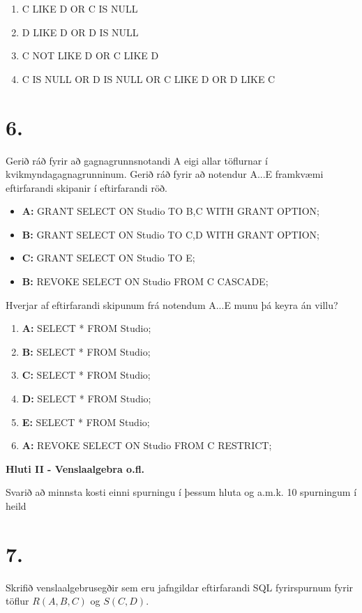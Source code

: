 \documentclass{article}
\newcommand{\bo}[1]{\textbf{#1}}
\newcommand{\enum}{\begin{enumerate}[label = \alph*.]}
\begin{document}
\enum
\item C LIKE D OR C IS NULL
\item D LIKE D OR D IS NULL
\item C NOT LIKE D OR C LIKE D
\item C IS NULL OR D IS NULL OR C LIKE D OR D LIKE C
\end{enumerate}

\newpage

\section{6.}
Gerið ráð fyrir að gagnagrunnsnotandi A eigi allar töflurnar í
kvikmyndagagnagrunninum. Gerið ráð fyrir að notendur A...E
framkvæmi eftirfarandi skipanir í eftirfarandi röð.

\begin{itemize}
\item \bo{A:} GRANT SELECT ON Studio TO B,C WITH GRANT OPTION;
\item \bo{B:} GRANT SELECT ON Studio TO C,D WITH GRANT OPTION;
\item \bo{C:} GRANT SELECT ON Studio TO E;
\item \bo{B:} REVOKE SELECT ON Studio FROM C CASCADE;
\end{itemize}
Hverjar af eftirfarandi skipunum frá notendum A...E munu þá keyra
án villu?
\enum
    \item \bo{A:} SELECT * FROM Studio;
    \item \bo{B:} SELECT * FROM Studio;
    \item \bo{C:} SELECT * FROM Studio;
    \item \bo{D:} SELECT * FROM Studio; 
    \item \bo{E:} SELECT * FROM Studio;
    \item \bo{A:} REVOKE SELECT ON Studio FROM C RESTRICT;
\end{enumerate}

\newpage

\begin{center}
    \bo{Hluti II - Venslaalgebra o.fl.}

    Svarið að minnsta kosti einni spurningu í þessum hluta og a.m.k.
    10 spurningum í heild
\end{center}

\section{7.}
Skrifið venslaalgebrusegðir sem eru jafngildar eftirfarandi SQL
fyrirspurnum fyrir töflur $R(A, B, C)$ og $S(C, D).$
\end{document}
